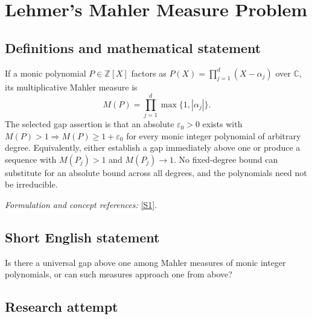 \documentclass[11pt,a4paper]{article}
\newcommand{\Z}{\mathbb{Z}}
\newcommand{\C}{\mathbb{C}}
\newcommand{\eps}{\varepsilon}
\newcommand{\sref}[2]{\hyperlink{source:#1:#2}{[S#2]}}
\newif\ifshowcatalogue
\newcommand{\cataloguescope}[1]{\ifshowcatalogue
 \paragraph{Exact scope in the supplied catalogue.}
 \begin{quote}\small #1\end{quote}\fi}
\begin{document}
\setcounter{section}{0}
\clearpage
\section*{\texorpdfstring{Lehmer’s Mahler Measure Problem}{Lehmer’s Mahler Measure Problem}}\label{30003556}
\subsection{Definitions and mathematical statement}
If a monic polynomial $P\in\Z[X]$ factors as
$P(X)=\prod_{j=1}^d(X-\alpha_j)$ over $\C$, its multiplicative Mahler measure is
\[
 M(P)=\prod_{j=1}^d\max\{1,|\alpha_j|\}.
\]
The selected gap assertion is that an absolute $\eps_0>0$ exists with
$M(P)>1\Longrightarrow M(P)\ge1+\eps_0$ for every monic integer polynomial of arbitrary degree. Equivalently, either establish a gap immediately above one or produce a sequence with $M(P_j)>1$ and $M(P_j)\to1$. No fixed-degree bound can substitute for an absolute bound across all degrees, and the polynomials need not be irreducible.
\par\smallskip\textit{Formulation and concept references:} \sref{30003556}{1}.
\cataloguescope{Prove that there exists an absolute epsilon > 0 such that every monic integer polynomial P with Mahler measure M(P) > 1 satisfies M(P) >= 1 + epsilon, or construct a sequence of such polynomials whose Mahler measures decrease to 1.}
\subsection{Short English statement}
Is there a universal gap above one among Mahler measures of monic integer polynomials, or can such measures approach one from above?
\subsection{Research attempt}
\end{document}
